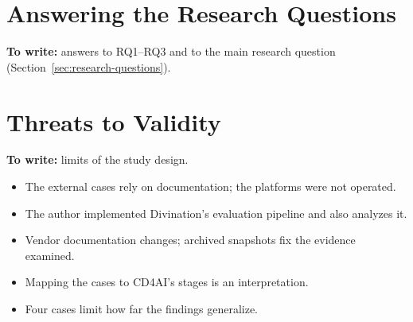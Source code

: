 \section{Answering the Research Questions}
\label{sec:discussion-rq}

\textbf{To write:} answers to RQ1--RQ3 and to the main research question
(Section~\ref{sec:research-questions}).

\section{Threats to Validity}
\label{sec:discussion-threats}

\textbf{To write:} limits of the study design.

\begin{itemize}
  \item The external cases rely on documentation; the platforms were not
    operated.
  \item The author implemented Divination's evaluation pipeline and also
    analyzes it.
  \item Vendor documentation changes; archived snapshots fix the evidence
    examined.
  \item Mapping the cases to CD4AI's stages is an interpretation.
  \item Four cases limit how far the findings generalize.
\end{itemize}

